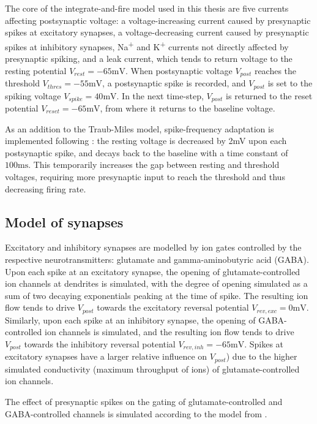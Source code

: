 \documentclass[a4paper,12pt]{report}
\theoremstyle{definition}
\begin{document}
The core of the integrate-and-fire model used in this thesis are five currents affecting postsynaptic voltage: a voltage-increasing current caused by presynaptic spikes at excitatory synapses, a voltage-decreasing current caused by presynaptic spikes at inhibitory synapses, Na\textsuperscript{+} and K\textsuperscript{+} currents not directly affected by presynaptic spiking, and a leak current, which tends to return voltage to the resting potential $V_{rest}=-65\mathrm{mV}$. When postsynaptic voltage $V_{post}$ reaches the threshold $V_{thres}=-55\mathrm{mV}$, a postsynaptic spike is recorded, and $V_{post}$ is set to the spiking voltage $V_{spike}=40\mathrm{mV}$. In the next time-step, $V_{post}$ is returned to the reset potential $V_{reset}=-65\mathrm{mV}$, from where it returns to the baseline voltage.

As an addition to the Traub-Miles model, spike-frequency adaptation is implemented following \cite{yeung2004synaptic}: the resting voltage is decreased by 2mV upon each postsynaptic spike, and decays back to the baseline with a time constant of $100\mathrm{ms}$. This temporarily increases the gap between resting and threshold voltages, requiring more presynaptic input to reach the threshold and thus decreasing firing rate.




\subsection{Model of synapses}

Excitatory and inhibitory synapses are modelled by ion gates controlled by the respective neurotransmitters: glutamate and gamma-aminobutyric acid (GABA). Upon each spike at an excitatory synapse, the opening of glutamate-controlled ion channels at dendrites is simulated, with the degree of opening simulated as a sum of two decaying exponentials peaking at the time of spike. The resulting ion flow tends to drive $V_{post}$ towards the excitatory reversal potential $V_{rev,exc}=0\mathrm{mV}$. Similarly, upon each spike at an inhibitory synapse, the opening of GABA-controlled ion channels is simulated, and the resulting ion flow tends to drive $V_{post}$ towards the inhibitory reversal potential $V_{rev,inh}=-65\mathrm{mV}$. Spikes at excitatory synapses have a larger relative influence on $V_{post}$) due to the higher simulated conductivity (maximum throughput of ions) of glutamate-controlled ion channels.

The effect of presynaptic spikes on the gating of glutamate-controlled and GABA-controlled channels is simulated according to the model from \cite{borgers2008gamma}.
\end{document}
